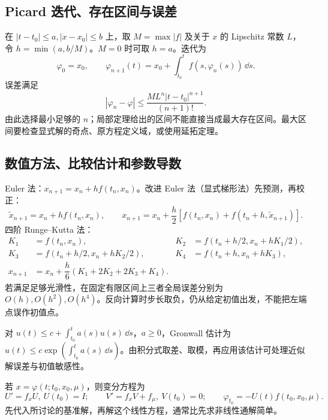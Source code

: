 \subsection{Picard 迭代、存在区间与误差}
在 $|t-t_0|\le a,|x-x_0|\le b$ 上，取 $M=\max|f|$ 及关于 $x$ 的 Lipschitz 常数 $L$，令 $h=\min(a,b/M)$。$M=0$ 时可取 $h=a$。迭代为
\[
 \varphi_0=x_0,\qquad\varphi_{n+1}(t)=x_0+\int_{t_0}^tf(s,\varphi_n(s))\,\dd s.
\]
误差满足
\[
 |\varphi_n-\varphi|\le\dfrac{ML^n|t-t_0|^{n+1}}{(n+1)!}.
\]
由此选择最小足够的 $n$；局部定理给出的区间不能直接当成最大存在区间。最大区间要检查显式解的奇点、原方程定义域，或使用延拓定理。
\subsection{数值方法、比较估计和参数导数}
Euler 法：$x_{n+1}=x_n+hf(t_n,x_n)$。改进 Euler 法（显式梯形法）先预测，再校正：
\[
 \widetilde x_{n+1}=x_n+hf(t_n,x_n),\qquad
 x_{n+1}=x_n+\dfrac h2[f(t_n,x_n)+f(t_n+h,\widetilde x_{n+1})].
\]
四阶 Runge--Kutta 法：
\[
 \begin{aligned}
 K_1&=f(t_n,x_n),&K_2&=f(t_n+h/2,x_n+hK_1/2),\\
 K_3&=f(t_n+h/2,x_n+hK_2/2),&K_4&=f(t_n+h,x_n+hK_3),\\
 x_{n+1}&=x_n+\dfrac h6(K_1+2K_2+2K_3+K_4).
 \end{aligned}
\]
若满足足够光滑性，在固定有限区间上三者全局误差分别为 $O(h),O(h^2),O(h^4)$。反向计算时步长取负，仍从给定初值出发，不能把左端点误作初值点。

对 $u(t)\le c+\displaystyle\int_{t_0}^ta(s)u(s)\,\dd s$，$a\ge0$，Gronwall 估计为 $u(t)\le c\exp(\displaystyle\int_{t_0}^ta(s)\,\dd s)$。由积分式取差、取模，再应用该估计可处理近似解误差与初值敏感性。

若 $x=\varphi(t;t_0,x_0,\mu)$，则变分方程为
\[
 U'=f_xU,\ U(t_0)=I;\qquad V'=f_xV+f_\mu,\ V(t_0)=0;
 \qquad \varphi_{t_0}=-U(t)f(t_0,x_0,\mu).
\]
先代入所讨论的基准解，再解这个线性方程，通常比先求非线性通解简单。
